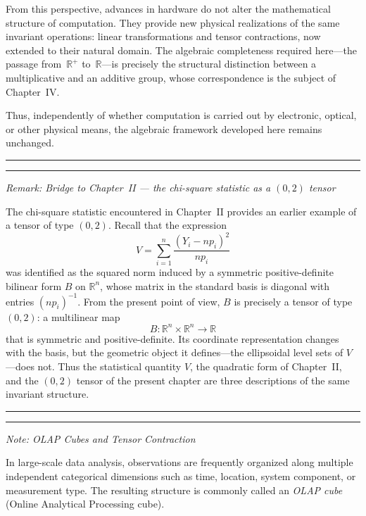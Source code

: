 \medskip

From this perspective, advances in hardware do not alter the mathematical
structure of computation.
They provide new physical realizations of the same invariant operations: linear
transformations and tensor contractions, now extended to their natural domain.
The algebraic completeness required here---the passage from~$\mathbb{R}^+$
to~$\mathbb{R}$---is precisely the structural distinction between a
multiplicative and an additive group, whose correspondence is the subject of
Chapter~IV.

\medskip

Thus, independently of whether computation is carried out by electronic,
optical, or other physical means, the algebraic framework developed here
remains unchanged.

\medskip
\hrule
\bigskip

\bigskip
\hrule
\medskip

\textit{Remark: Bridge to Chapter~II --- the chi-square statistic as a
$(0,2)$ tensor}

\medskip

The chi-square statistic encountered in Chapter~II provides an earlier example
of a tensor of type $(0,2)$.
Recall that the expression
\[
V
=
\sum_{i=1}^{n}
\frac{(Y_i - np_i)^2}{np_i}
\]
was identified as the squared norm induced by a symmetric positive-definite
bilinear form $B$ on $\mathbb{R}^n$, whose matrix in the standard basis is
diagonal with entries $(np_i)^{-1}$.
From the present point of view, $B$ is precisely a tensor of type $(0,2)$: a
multilinear map
\[
B : \mathbb{R}^n \times \mathbb{R}^n \longrightarrow \mathbb{R}
\]
that is symmetric and positive-definite.
Its coordinate representation changes with the basis, but the geometric
object it defines---the ellipsoidal level sets of $V$---does not.
Thus the statistical quantity $V$, the quadratic form of Chapter~II, and the
$(0,2)$ tensor of the present chapter are three descriptions of the same
invariant structure.

\medskip
\hrule
\bigskip

\bigskip
\hrule
\medskip

\textit{Note: OLAP Cubes and Tensor Contraction}

\medskip

In large-scale data analysis, observations are frequently organized along
multiple independent categorical dimensions such as time, location, system
component, or measurement type.
The resulting structure is commonly called an \emph{OLAP cube} (Online
Analytical Processing cube).

